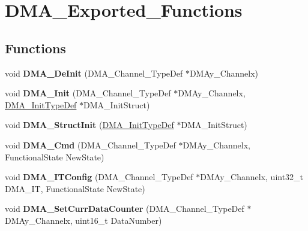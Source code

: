 \hypertarget{group__DMA__Exported__Functions}{
\section{DMA\_\-Exported\_\-Functions}
\label{group__DMA__Exported__Functions}
}
\subsection*{Functions}
\begin{DoxyCompactItemize}
\item 
\hypertarget{group__DMA__Exported__Functions_ga21ca0d50b13e502db5ab5feb484f9ece}{
void {\bfseries DMA\_\-DeInit} (DMA\_\-Channel\_\-TypeDef $\ast$DMAy\_\-Channelx)}
\label{group__DMA__Exported__Functions_ga21ca0d50b13e502db5ab5feb484f9ece}

\item 
\hypertarget{group__DMA__Exported__Functions_ga7c3d1b9dc041f8e5f2cfc8d5dd858278}{
void {\bfseries DMA\_\-Init} (DMA\_\-Channel\_\-TypeDef $\ast$DMAy\_\-Channelx, \hyperlink{structDMA__InitTypeDef}{DMA\_\-InitTypeDef} $\ast$DMA\_\-InitStruct)}
\label{group__DMA__Exported__Functions_ga7c3d1b9dc041f8e5f2cfc8d5dd858278}

\item 
\hypertarget{group__DMA__Exported__Functions_ga0f7f95f750a90a6824f4e9b6f58adc7e}{
void {\bfseries DMA\_\-StructInit} (\hyperlink{structDMA__InitTypeDef}{DMA\_\-InitTypeDef} $\ast$DMA\_\-InitStruct)}
\label{group__DMA__Exported__Functions_ga0f7f95f750a90a6824f4e9b6f58adc7e}

\item 
\hypertarget{group__DMA__Exported__Functions_ga8e7cb6b9ae5f142e2961df879cdaba65}{
void {\bfseries DMA\_\-Cmd} (DMA\_\-Channel\_\-TypeDef $\ast$DMAy\_\-Channelx, FunctionalState NewState)}
\label{group__DMA__Exported__Functions_ga8e7cb6b9ae5f142e2961df879cdaba65}

\item 
\hypertarget{group__DMA__Exported__Functions_ga0bb60360be9cd57f96399be2f3b5eb2b}{
void {\bfseries DMA\_\-ITConfig} (DMA\_\-Channel\_\-TypeDef $\ast$DMAy\_\-Channelx, uint32\_\-t DMA\_\-IT, FunctionalState NewState)}
\label{group__DMA__Exported__Functions_ga0bb60360be9cd57f96399be2f3b5eb2b}

\item 
\hypertarget{group__DMA__Exported__Functions_gade5d9e532814eaa46514cb385fdff709}{
void {\bfseries DMA\_\-SetCurrDataCounter} (DMA\_\-Channel\_\-TypeDef $\ast$DMAy\_\-Channelx, uint16\_\-t DataNumber)}
\label{group__DMA__Exported__Functions_gade5d9e532814eaa46514cb385fdff709}


\end{DoxyCompactItemize}
